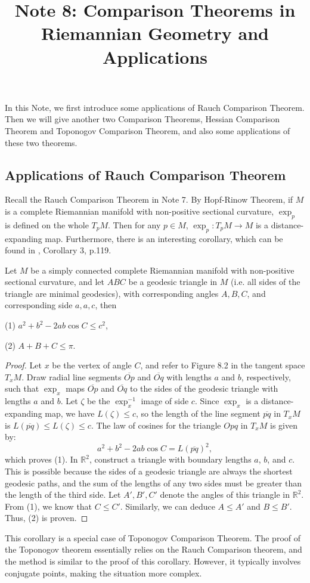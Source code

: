 \documentclass{ctexart}
\title{Note 8: Comparison Theorems in Riemannian Geometry and Applications}
\date{} %
\begin{document}
\maketitle

In this Note, we first introduce some applications of Rauch Comparison Theorem. Then we will give another two Comparison Theorems, Hessian Comparison Theorem and Toponogov Comparison Theorem, 
and also some applications of these two theorems. 


\subsection*{Applications of Rauch Comparison Theorem}

Recall the Rauch Comparison Theorem in Note 7. By Hopf-Rinow Theorem, if $M$ is a complete Riemannian manifold with non-positive sectional curvature, $\exp_p$ is defined on the whole $T_pM$. 
Then for any $p \in M$, $\exp_{p}: T_pM \rightarrow M$ is a distance-expanding map. 
Furthermore, there is an interesting corollary, which can be found in \cite{WuHongXi2014}, Corollary 3, p.119.
\begin{corollary}
    Let $M$ be a simply connected complete Riemannian manifold with non-positive sectional curvature, and let $ABC$ be a geodesic triangle in $M$ 
    (i.e. all sides of the triangle are minimal geodesics), with corresponding angles $A, B, C$, and corresponding side $a, a, c$, then 

    (1) $a^2+b^2-2 a b \cos C \leq c^2$, 

    (2) $A+B+C \leq \pi$. 
\end{corollary}
\begin{proof}[Proof]
    Let $x$ be the vertex of angle $C$, and refer to Figure 8.2 in the tangent space $T_x M$. Draw radial line segments $\overline{O p}$ and $\overline{O q}$ with lengths $a$ and $b$, respectively, 
    such that $\exp_x$ maps $\overline{O p}$ and $\overline{O q}$ to the sides of the geodesic triangle with lengths $a$ and $b$. Let $\zeta$ be the $\exp_x^{-1}$ image of side $c$. 
    Since $\exp_x$ is a distance-expanding map, we have $L(\zeta) \leq c$, so the length of the line segment $\overline{p q}$ in $T_x M$ is $L(\overline{p q}) \leq L(\zeta) \leq c$.
    The law of cosines for the triangle $O p q$ in $T_x M$ is given by:
    $$
    a^2 + b^2 - 2ab\cos C = L(\overline{p q})^2,
    $$
    which proves (1).
    In $\mathbb{R}^2$, construct a triangle with boundary lengths $a$, $b$, and $c$. This is possible because the sides of a geodesic triangle are always the shortest geodesic paths, 
    and the sum of the lengths of any two sides must be greater than the length of the third side. Let $A', B', C'$ denote the angles of this triangle in $\mathbb{R}^2$.
    From (1), we know that $C \leq C'$. Similarly, we can deduce $A \leq A'$ and $B \leq B'$. Thus, (2) is proven.
\end{proof}
This corollary is a special case of Toponogov Comparison Theorem. The proof of the Toponogov theorem essentially relies on the Rauch Comparison theorem,
and the method is similar to the proof of this corollary. However, it typically involves conjugate points, making the situation more complex.
\end{document}
